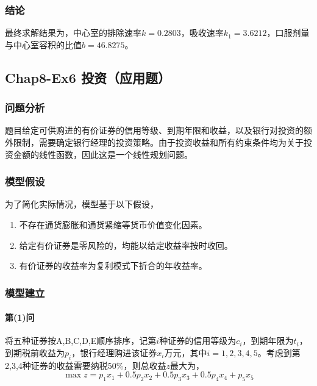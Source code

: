 \documentclass[12pt,a4paper]{article}
\begin{document}
\subsubsection{结论}

最终求解结果为，中心室的排除速率$k=0.2803$，吸收速率$k_1=3.6212$，口服剂量与中心室容积的比值$b=46.8275$。

\subsection{Chap8-Ex6 投资（应用题）}

\subsubsection{问题分析}

题目给定可供购进的有价证券的信用等级、到期年限和收益，以及银行对投资的额外限制，需要确定银行经理的投资策略。由于投资收益和所有约束条件均为关于投资金额的线性函数，因此这是一个线性规划问题。

\subsubsection{模型假设}

为了简化实际情况，模型基于以下假设，
\begin{enumerate}
    \item 不存在通货膨胀和通货紧缩等货币价值变化因素。
    \item 给定有价证券是零风险的，均能以给定收益率按时收回。
    \item 有价证券的收益率为复利模式下折合的年收益率。
\end{enumerate}

\subsubsection{模型建立}

\paragraph{第(1)问} 将五种证券按A,B,C,D,E顺序排序，记第$i$种证券的信用等级为$c_i$，到期年限为$t_i$，到期税前收益为$p_i$，银行经理购进该证券$x_i$万元，其中$i=1,2,3,4,5$。考虑到第2,3,4种证券的收益需要纳税50\%，则总收益$z$最大为，
\begin{equation}\label{eq:ex6_profit1}
    \max z = p_1 x_1 + 0.5 p_2 x_2 + 0.5 p_3 x_3 + 0.5 p_4 x_4 + p_5 x_5
\end{equation}
\end{document}
